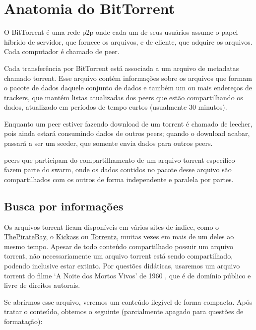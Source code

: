 
\chapter{Anatomia do BitTorrent}

O BitTorrent é uma rede \gls{p2p} onde cada um de seus usuários assume o papel híbrido
de servidor, que fornece os arquivos, e de cliente, que adquire os arquivos. Cada
computador é chamado de \gls{peer}.

Cada transferência por BitTorrent está associada a um arquivo de \glspl{metadata}
chamado \gls{torrent}. Esse arquivo contém informações sobre os arquivos que formam o
pacote de dados daquele conjunto de dados e também um ou mais endereços de
\glspl*{tracker}, que mantém listas atualizadas dos \glspl*{peer} que estão
compartilhando os dados, atualizado em períodos de tempo curtos (usualmente 30 minutos).

Enquanto um \gls*{peer} estiver fazendo download de um \gls*{torrent} é chamado de
\gls{leecher}, pois ainda estará consumindo dados de outros \glspl*{peer}; quando o
download acabar, passará a ser um \gls{seeder}, que somente envia dados para outros
\glspl*{peer}.

\Glspl*{peer} que participam do compartilhamento de um arquivo \gls*{torrent} específico
fazem parte do \gls{swarm}, onde os dados contidos no pacote desse arquivo são
compartilhados com os outros de forma independente e paralela por partes.

\section{Busca por informações}

Os arquivos \gls*{torrent} ficam disponíveis em vários sites de índice, como o
\href{http://thepiratebay.sx/}{ThePirateBay}, o \href{http://kickass.to/}{Kickass} ou
\href{https://torrentz.eu/}{Torrentz}, muitas vezes em mais de um deles ao mesmo tempo.
Apesar de todo conteúdo compartilhado possuir um arquivo \gls*{torrent}, não
necessariamente um arquivo \gls*{torrent} está sendo compartilhado, podendo inclusive
estar extinto. Por questões didáticas, usaremos um arquivo torrent do filme `A Noite
dos Mortos Vivos' de 1960 \cite{torrent-file}, que é de domínio público e livre de
direitos autorais.

Se abrirmos esse arquivo, veremos um conteúdo ilegível de forma compacta. Após tratar o
conteúdo, obtemos o seguinte (parcialmente apagado para questões de formatação):


